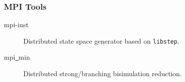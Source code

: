 \documentclass{beamer}
\begin{document}
\begin{frame}[fragile]
\frametitle{MPI Tools}
\begin{description}
\item[mpi-inst] Distributed state space generator based on \verb+libstep+.
\item[mpi\underline{~}min] Distributed strong/branching bisimulation reduction.
\end{description}
\end{frame}
\end{document}

